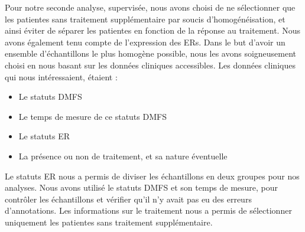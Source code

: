 			\pagebreak

			Pour notre seconde analyse, supervisée, nous avons choisi de ne sélectionner que les patientes sans traitement supplémentaire par soucis d'homogénéisation, et ainsi éviter de séparer les patientes en fonction de la réponse au traitement.
			Nous avons également tenu compte de l'expression des \aclp{ER}.
			Dans le but d'avoir un ensemble d'échantillons le plus homogène possible, nous les avons soigneusement choisi en nous basant sur les données cliniques accessibles.
			Les données cliniques qui nous intéressaient, étaient :
			\begin{itemize}
				\item Le statuts \acs{DMFS}
				\item Le temps de mesure de ce statuts \acs{DMFS}
				\item Le statuts \acs{ER}
				\item La présence ou non de traitement, et sa nature éventuelle
			\end{itemize}

			Le statuts \acs{ER} nous a permis de diviser les échantillons en deux groupes pour nos analyses.
			Nous avons utilisé le statuts \acs{DMFS} et son temps de mesure, pour contrôler les échantillons et vérifier qu'il n'y avait pas eu des erreurs d'annotations.
			Les informations sur le traitement nous a permis de sélectionner uniquement les patientes sans traitement supplémentaire.

